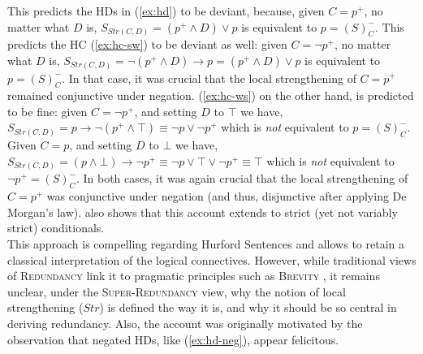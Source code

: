 This predicts the HDs in (\ref{ex:hd}) to be deviant, because, given $C=p^+$, no matter what $D$ is, $S_{Str(C, D)} = (p^+\wedge D) \vee p$ is equivalent to $p=(S)^-_C$. This predicts the HC (\ref{ex:hc-sw}) to be deviant as well: given $C=\neg p^+$, no matter what $D$ is, $S_{Str(C, D)} = \neg(p^+\wedge D) \rightarrow p = (p^+ \wedge D) \vee p$ is equivalent to $p=(S)^-_C$. In that case, it was crucial that the local strengthening of $C=p^+$ remained conjunctive under negation. 
(\ref{ex:hc-ws}) on the other hand, is predicted to be fine: given $C=\neg p^+$, and setting $D$ to $\top$ we have, $S_{Str(C, D)} = p \rightarrow \neg(p^+\wedge \top) \equiv \neg p \vee \neg p^+$ which is \textit{not} equivalent to $p=(S)^-_C$. Given $C=p$, and setting $D$ to $\bot$ we have, $S_{Str(C, D)} = (p \wedge \bot) \rightarrow \neg p^+ \equiv \neg p \vee \top \vee \neg p^+\equiv\top$ which is \textit{not} equivalent to $\neg p^+=(S)^-_C$. In both cases, it was again crucial that the local strengthening of $C=p^+$ was conjunctive under negation (and thus, disjunctive after applying De Morgan's law).
\citet{Kalomoiros2024} also shows that this account extends to strict (yet not variably strict) conditionals.\\

This approach is compelling regarding Hurford Sentences and allows to retain a classical interpretation of the logical connectives. However, while traditional views of \textsc{Redundancy} link it to pragmatic principles such as \textsc{Brevity} \citep{Grice1975}, it remains unclear, under the \textsc{Super-Redundancy} view, why the notion of local strengthening ($Str$) is defined the way it is, and why it should be so central in deriving redundancy. Also, the account was originally motivated by the observation that negated HDs, like (\ref{ex:hd-neg}), appear felicitous.

\begin{exe}
	\label{ex:hd-neg}
\end{exe}

